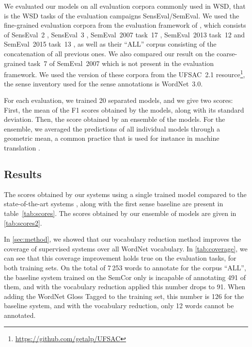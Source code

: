 \documentclass[11pt,a4paper]{article}
\begin{document}
We evaluated our models on all evaluation corpora commonly used in WSD, that is the WSD tasks of the evaluation campaigns SensEval/SemEval. 
We used the fine-grained evaluation corpora from the evaluation framework of \citet{raganatocamachocolladosnavigli2017}, which consists of SensEval~2 \citep{Edmonds2001}, SensEval~3 \citep{W040811}, SemEval~2007 task~17 \citep{Pradhan2007}, SemEval~2013 task~12 \citep{Navigli2013} and SemEval~2015 task~13 \citep{moronavigli2015}, as well as their ``ALL'' corpus consisting of the concatenation of all previous ones. We also compared our result on the coarse-grained task~7 of SemEval~2007 \citep{Navigli2007} which is not present in the evaluation framework. We used the version of these corpora from the UFSAC~2.1 resource\footnote{\url{https://github.com/getalp/UFSAC}}, the sense inventory used for the sense annotations is WordNet~3.0.

For each evaluation, we trained 20 separated models, and we give two scores: First, the mean of the F1 scores obtained by the models, along with its standard deviation. Then, the score obtained by an ensemble of the models. For the ensemble, we averaged the predictions of all individual models through a geometric mean, a common practice that is used for instance in machine translation \citep{Sutskever2014,gehring2017}.



\subsection{Results}

The scores obtained by our systems using a single trained model compared to the state-of-the-art systems \cite{yuan_2016,raganato2017,iacobacci2016embeddings}, along with the first sense baseline are present in table~\ref{tab:scores}. The scores obtained by our ensemble of models are given in \autoref{tab:scores2}.

In \autoref{sec:method}, we showed that our vocabulary reduction method improves the coverage of supervised systems over all WordNet vocabulary. In \autoref{tab:coverage}, we can see that this coverage improvement holds true on the evaluation tasks, for both training sets. On the total of 7\,253 words to annotate for the corpus ``ALL'', the baseline system trained on the SemCor only is incapable of annotating 491 of them, and with the vocabulary reduction applied this number drops to 91. When adding the WordNet Gloss Tagged to the training set, this number is 126 for the baseline system, and with the vocabulary reduction, only 12 words cannot be annotated. 
\end{document}
